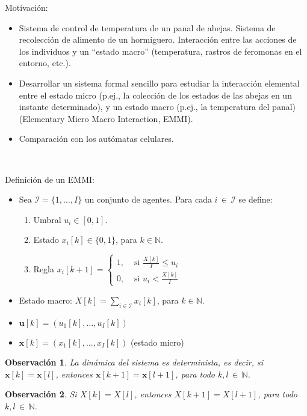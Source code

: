 \documentclass{article}
\newtheorem{obs}{Observación}
\begin{document}
Motivación: 
\begin{itemize}
\item Sistema de control de temperatura de un panal de abejas. Sistema de recolección de alimento de un hormiguero. Interacción entre las acciones de los individuos y un ``estado macro'' (temperatura, rastros de feromonas en el entorno, etc.).
\item Desarrollar un sistema formal sencillo para  estudiar la interacción elemental entre el estado micro (p.ej., la colección de los estados de las abejas en un instante determinado), y un estado macro (p.ej., la temperatura del panal) (Elementary Micro Macro Interaction, EMMI). 
\item Comparación con los autómatas celulares.
\end{itemize}

\

Definición de un EMMI:
\begin{itemize}
\item Sea $\mathcal{I}=\{1,\ldots,I\}$ un conjunto de agentes. Para cada $i\,{\in}\,\mathcal{I}$ se define:
	\begin{enumerate}[label=(\alph*)]
	\item Umbral $u_i\in[0,1]$.
	\item Estado $x_i[k]\in\{0, 1\}$, para $k\in\mathbb{N}$.
	\item Regla  $x_i[k+1]=\begin{cases} 1, & \mbox{ si }\frac{X[k]}{I}\leq u_i\\ 0, & \mbox{ si } u_i < \frac{X[k]}{I}\end{cases}$
	\end{enumerate}

\item Estado macro: $X[k]=\sum_{i\in\mathcal{I}} x_i[k]$, para $k\in\mathbb{N}$.
\end{itemize}

\begin{itemize}
\item $\bm{u}[k]= (u_1[k],\ldots,u_I[k])$
\item $\bm{x}[k]= (x_1[k],\ldots,x_I[k])$ (estado micro)
\end{itemize}

\begin{obs}
La dinámica del sistema es determinista, es decir, si $\bm{x}[k]=\bm{x}[l]$, entonces $\bm{x}[k{+}1]=\bm{x}[l{+}1]$, para todo $k,l\,{\in}\,\mathbb{N}$.
\end{obs}

\begin{obs}
Si $X[k]=X[l]$, entonces $X[k{+}1]=X[l{+}1]$, para todo $k,l\,{\in}\,\mathbb{N}$.
\end{obs}
\end{document}
